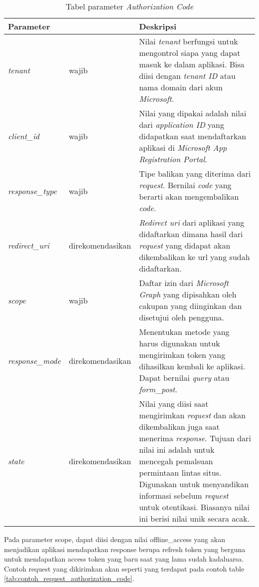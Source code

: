 \begin{table}[H]
	\centering 
	\caption{Tabel parameter \textit{Authorization Code}}
	\label{tab:parameter_authorization_code}
	\begin{tabular}{|p{3cm}|p{3cm}|p{9cm}|}
	\toprule
	\textbf{Parameter} & & \textbf{Deskripsi}\\ \hline 
	\textit{tenant} & wajib & Nilai \textit{tenant} berfungsi untuk mengontrol siapa yang dapat masuk ke dalam aplikasi. Bisa diisi dengan \textit{tenant ID} atau nama domain dari akun \textit{Microsoft}.\\ \hline 
	\textit{client\_id} & wajib & Nilai yang dipakai adalah nilai dari \textit{application ID} yang didapatkan saat mendaftarkan aplikasi di \textit{Microsoft App Registration Portal}.\\ \hline 
	\textit{response\_type} & wajib & Tipe balikan yang diterima dari \textit{request}. Bernilai 				\textit{code} yang berarti akan mengembalikan \textit{code}. \\ \hline 
	\textit{redirect\_uri} & direkomendasikan & \textit{Redirect uri} dari aplikasi yang didaftarkan dimana hasil dari \textit{request} yang didapat akan dikembalikan ke url yang sudah didaftarkan. \\ \hline 
	\textit{scope} & wajib & Daftar izin dari \textit{Microsoft Graph} yang dipisahkan oleh cakupan yang diinginkan dan disetujui oleh pengguna. \\ \hline 
\textit{response\_mode} & direkomendasikan & Menentukan metode yang harus digunakan untuk mengirimkan token yang dihasilkan kembali ke aplikasi. Dapat bernilai \textit{query} atau \textit{form\_post}. \\ \hline 
	\textit{state} & direkomendasikan & Nilai yang diisi saat mengirimkan \textit{request} dan akan dikembalikan juga saat menerima \textit{response}. Tujuan dari nilai ini adalah untuk mencegah pemalsuan permintaan lintas situs. Digunakan untuk menyandikan informasi sebelum \textit{request} untuk otentikasi. Biasanya nilai ini berisi nilai unik secara acak. \\ \bottomrule
\end{tabular}  
\end{table}

Pada parameter scope, dapat diisi dengan nilai offline\_access yang akan menjadikan aplikasi mendapatkan response berupa refresh token yang berguna untuk mendapatkan access token yang baru saat yang lama sudah kadaluarsa. Contoh request yang dikirimkan akan seperti yang terdapat pada contoh table \ref{tab:contoh_request_authorization_code}.

